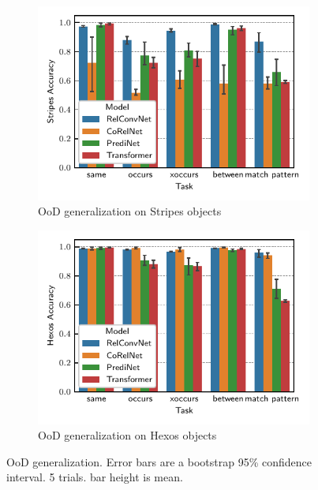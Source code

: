 \begin{figure}
    \begin{subfigure}{0.5\textwidth}
        \centering
        \includegraphics[width=\textwidth]{figs/experiments/stripes_acc.pdf}
        \caption{OoD generalization on Stripes objects}
    \end{subfigure}
    \begin{subfigure}{0.5\textwidth}
        \centering
        \includegraphics[width=\textwidth]{figs/experiments/hexos_acc.pdf}
        \caption{OoD generalization on Hexos objects}
    \end{subfigure}
    \caption{OoD generalization. Error bars are a bootstrap 95\% confidence interval. 5 trials. bar height is mean.}\label{fig:ood_generalization}
\end{figure}